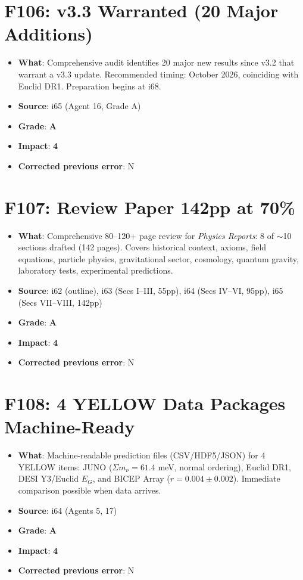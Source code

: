 \documentclass[11pt,a4paper]{article}
\newcommand{\grade}[1]{\textbf{#1}}
\newcommand{\impact}[1]{\textbf{#1}}
\begin{document}
\section{F106: v3.3 Warranted (20 Major Additions)}
\begin{itemize}[nosep]
\item \textbf{What}: Comprehensive audit identifies 20 major new results since v3.2 that warrant a v3.3 update. Recommended timing: October 2026, coinciding with Euclid DR1. Preparation begins at i68.
\item \textbf{Source}: i65 (Agent 16, Grade A)
\item \textbf{Grade}: \grade{A}
\item \textbf{Impact}: \impact{4}
\item \textbf{Corrected previous error}: N
\end{itemize}

\section{F107: Review Paper 142pp at 70\%}
\begin{itemize}[nosep]
\item \textbf{What}: Comprehensive 80--120+ page review for \textit{Physics Reports}: 8 of $\sim$10 sections drafted (142 pages). Covers historical context, axioms, field equations, particle physics, gravitational sector, cosmology, quantum gravity, laboratory tests, experimental predictions.
\item \textbf{Source}: i62 (outline), i63 (Secs I--III, 55pp), i64 (Secs IV--VI, 95pp), i65 (Secs VII--VIII, 142pp)
\item \textbf{Grade}: \grade{A}
\item \textbf{Impact}: \impact{4}
\item \textbf{Corrected previous error}: N
\end{itemize}

\section{F108: 4 YELLOW Data Packages Machine-Ready}
\begin{itemize}[nosep]
\item \textbf{What}: Machine-readable prediction files (CSV/HDF5/JSON) for 4 YELLOW items: JUNO ($\Sigma m_\nu = 61.4$ meV, normal ordering), Euclid DR1, DESI Y3/Euclid $E_G$, and BICEP Array ($r = 0.004 \pm 0.002$). Immediate comparison possible when data arrives.
\item \textbf{Source}: i64 (Agents 5, 17)
\item \textbf{Grade}: \grade{A}
\item \textbf{Impact}: \impact{4}
\item \textbf{Corrected previous error}: N
\end{itemize}
\end{document}
